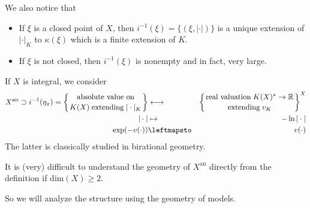 We also notice that
\begin{itemize}
  \item If $\xi$ is a closed point of $X$, then $i^{-1}(\xi)=\{(\xi,|\cdot|)\}$ is a
        unique extension of $|\cdot|_{K}$ to $\kappa(\xi)$ which is a finite extension of $K$.
  \item If $\xi$ is not closed, then $i^{-1}(\xi)$ is nonempty and in fact, very large.
\end{itemize}

If $X$ is integral, we consider
\begin{eqnarray*}
X^{\mathrm{an}}\supset i^{-1}(\eta_{x})=
\left\{
\text{absolute value on} \scriptstyle \atop
K(X) \;\text{extending} \; |\cdot|_{K}
\right\}
&\longleftrightarrow &
\left\{
\text{real valuation} \; K(X)^{*}\rightarrow\mathbb{R} \scriptstyle \atop
\text{extending} \; v_{K}
\right\}^{X}\\
|\cdot|&\mapsto &-\ln|\cdot|\\
\exp(-v(\cdot))&\leftmapsto &v(\cdot)
\end{eqnarray*}
The latter is classically studied in birational geometry.

\begin{observation}
It is (very) difficult to understand the geometry of $X^{\mathrm{an}}$ directly from the definition
if $\mathrm{dim}(X)\geq 2$.
\end{observation}
So we will analyze the structure using the geometry of models.
